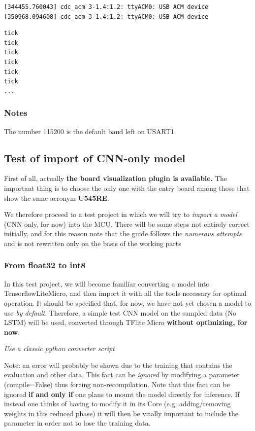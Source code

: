 \begin{lstlisting}[language=bash]
[344455.760043] cdc_acm 3-1.4:1.2: ttyACM0: USB ACM device
[350968.094608] cdc_acm 3-1.4:1.2: ttyACM0: USB ACM device
\end{lstlisting}


\begin{lstlisting}[language=bash]
tick
tick
tick
tick
tick
tick
...
\end{lstlisting}

\subsubsection{Notes}
The number 115200 is the default baud left on USART1.

\subsection{Test of import of CNN-only model}
First of all, actually \textbf{the board visualization plugin is available.} The important thing is to choose the only one with the entry board among those that show the same acronym \textbf{U545RE}.

We therefore proceed to a test project in which we will try to \textit{import a model} (CNN only, for now) into the MCU. There will be some steps not entirely correct initially, and for this reason note that the guide follows the \textit{numerous attempts} and is not rewritten only on the basis of the working parts

\subsubsection{From float32 to int8}
In this test project, we will become familiar converting a model into TensorflowLiteMicro, and then import it with all the tools necessary for optimal operation. It should be specified that, for now, we have not yet chosen a model to use \textit{by default}. Therefore, a simple test CNN model on the sampled data (No LSTM) will be used, converted through TFlite Micro \textbf{without optimizing, for now}.

\begin{center}
    \textit{Use a classic python converter script}
\end{center}


Note: an error will probably be shown due to the training that contains the evaluation and other data. This fact can be \textit{ignored} by modifying a parameter (compile=False) thus forcing non-recompilation. Note that this fact can be ignored \textbf{if and only if} one plans to mount the model directly for inference. If instead one thinks of having to modify it in its Core (e.g. adding/removing weights in this reduced phase) it will then be vitally important to include the parameter in order not to lose the training data.

